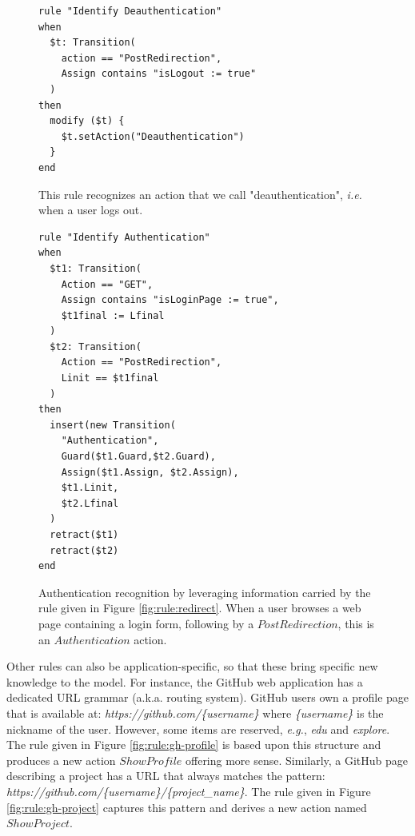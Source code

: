 \begin{figure}[h]
\begin{framed}
\begin{BVerbatim}
rule "Identify Deauthentication"
when
  $t: Transition(
    action == "PostRedirection",
    Assign contains "isLogout := true"
  )
then
  modify ($t) {
    $t.setAction("Deauthentication")
  }
end
\end{BVerbatim}
\end{framed}

    \caption{This rule recognizes an action that we call
    "deauthentication", \emph{i.e.} when a user logs out.}
    \label{fig:rule:deauth}
\end{figure}

\begin{figure}[h]
\begin{framed}
\begin{BVerbatim}
rule "Identify Authentication"
when
  $t1: Transition(
    Action == "GET",
    Assign contains "isLoginPage := true",
    $t1final := Lfinal
  )
  $t2: Transition(
    Action == "PostRedirection",
    Linit == $t1final
  )
then
  insert(new Transition(
    "Authentication",
    Guard($t1.Guard,$t2.Guard),
    Assign($t1.Assign, $t2.Assign),
    $t1.Linit,
    $t2.Lfinal
  )
  retract($t1)
  retract($t2)
end
\end{BVerbatim}
\end{framed}

    \caption{Authentication recognition by leveraging information
    carried by the rule given in Figure \ref{fig:rule:redirect}.
    When a user browses a web page containing a login form,
    following by a $PostRedirection$, this is an $Authentication$
    action.}
    \label{fig:rule:auth}
\end{figure}

Other rules can also be application-specific, so that these bring
specific new knowledge to the model. For instance, the GitHub web
application has a dedicated URL grammar (a.k.a. routing system).
GitHub users own a profile page that is available at:
\textit{https://github.com/\{username\}} where \textit{\{username\}}
is the nickname of the user. However, some items are reserved,
\emph{e.g.}, \textit{edu} and \textit{explore}. The rule given in Figure
\ref{fig:rule:gh-profile} is based upon this structure and
produces a new action $ShowProfile$ offering more sense.
Similarly, a GitHub page describing a project has a URL that
always matches the pattern:
\textit{https://github.com/\{username\}/\{project\_name\}}. The
rule given in Figure \ref{fig:rule:gh-project} captures this
pattern and derives a new action named $ShowProject$.

